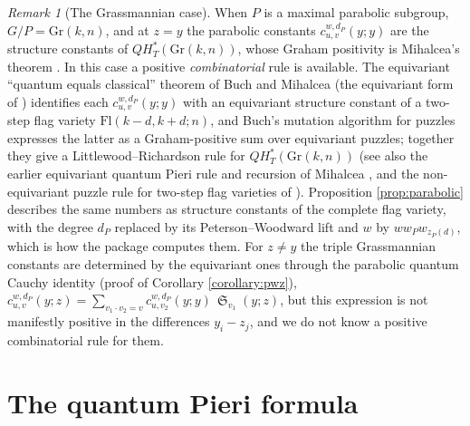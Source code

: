 \documentclass{amsart}
\theoremstyle{definition}
\theoremstyle{remark}
\newtheorem{remark}[lemma]{Remark}
\numberwithin{equation}{section}
\DeclareMathOperator{\sch}{\mathfrak{S}}
\begin{document}
\begin{remark}[The Grassmannian case] \label{remark:grassmannian}
When $P$ is a maximal parabolic subgroup, $G/P=\mathrm{Gr}(k,n)$, and at $z=y$ the parabolic constants $c_{u,v}^{w,d_P}(y;y)$ are the structure constants of $QH_T^*(\mathrm{Gr}(k,n))$, whose Graham positivity is Mihalcea's theorem \cite{mihalcea2006positivity}. In this case a positive \emph{combinatorial} rule is available. The equivariant ``quantum equals classical'' theorem of Buch and Mihalcea \cite{buch2011qkgrass} (the equivariant form of \cite{buch2003gwgrass}) identifies each $c_{u,v}^{w,d_P}(y;y)$ with an equivariant structure constant of a two-step flag variety $\mathrm{Fl}(k-d,k+d;n)$, and Buch's mutation algorithm for puzzles \cite{buch2015mutations} expresses the latter as a Graham-positive sum over equivariant puzzles; together they give a Littlewood--Richardson rule for $QH_T^*(\mathrm{Gr}(k,n))$ (see also the earlier equivariant quantum Pieri rule and recursion of Mihalcea \cite{mihalcea2006equivariant}, and the non-equivariant puzzle rule for two-step flag varieties of \cite{buch2016puzzle}). Proposition \ref{prop:parabolic} describes the same numbers as structure constants of the complete flag variety, with the degree $d_P$ replaced by its Peterson--Woodward lift and $w$ by $ww_Pw_{z_P(d)}$, which is how the package \cite{schubmult} computes them. For $z\neq y$ the triple Grassmannian constants are determined by the equivariant ones through the parabolic quantum Cauchy identity (proof of Corollary \ref{corollary:pwz}), $c_{u,v}^{w,d_P}(y;z)=\sum_{v_1\cdot v_2=v}c_{u,v_2}^{w,d_P}(y;y)\,\sch_{v_1}(y;z)$, but this expression is not manifestly positive in the differences $y_i-z_j$, and we do not know a positive combinatorial rule for them.
\end{remark}


\section{The quantum Pieri formula} \label{section:pieri}
\end{document}
